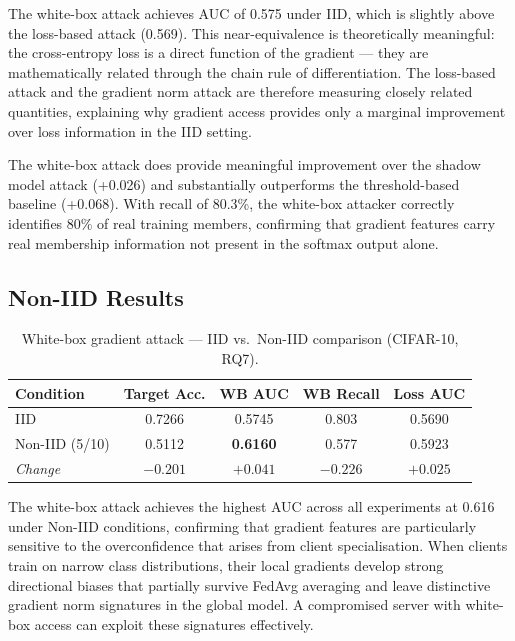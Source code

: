 \documentclass[12pt, a4paper]{report}
\begin{document}
The white-box attack achieves AUC of 0.575 under IID, which is slightly above
the loss-based attack (0.569). This near-equivalence is
theoretically meaningful: the cross-entropy loss is a direct function of the
gradient --- they are mathematically related through the chain rule of
differentiation. The loss-based attack and the gradient norm attack are therefore
measuring closely related quantities, explaining why gradient access provides
only a marginal improvement over loss information in the IID setting.

The white-box attack does provide meaningful improvement over the shadow model
attack (+0.026) and substantially outperforms the threshold-based baseline
(+0.068). With recall of 80.3\%, the white-box attacker correctly identifies
80\% of real training members, confirming that gradient features carry real
membership information not present in the softmax output alone.

\subsection{Non-IID Results}

\begin{table}[H]
  \centering
  \caption{White-box gradient attack --- IID vs.\ Non-IID comparison (CIFAR-10, RQ7).}
  \label{tab:whitebox_noniid}
  \begin{tabular}{lcccc}
    \toprule
    \textbf{Condition} & \textbf{Target Acc.} & \textbf{WB AUC} & \textbf{WB Recall} & \textbf{Loss AUC} \\
    \midrule
    IID             & 0.7266 & 0.5745 & 0.803 & 0.5690 \\
    Non-IID (5/10)  & 0.5112 & \textbf{0.6160} & 0.577 & 0.5923 \\
    \midrule
    \textit{Change} & $-0.201$ & $\mathbf{+0.041}$ & $-0.226$ & $+0.025$ \\
    \bottomrule
  \end{tabular}
\end{table}

The white-box attack achieves the highest AUC across all experiments at 0.616
under Non-IID conditions, confirming that gradient features are particularly
sensitive to the overconfidence that arises from client specialisation. When
clients train on narrow class distributions, their local gradients develop
strong directional biases that partially survive FedAvg averaging and leave
distinctive gradient norm signatures in the global model. A compromised server
with white-box access can exploit these signatures effectively.
\end{document}
